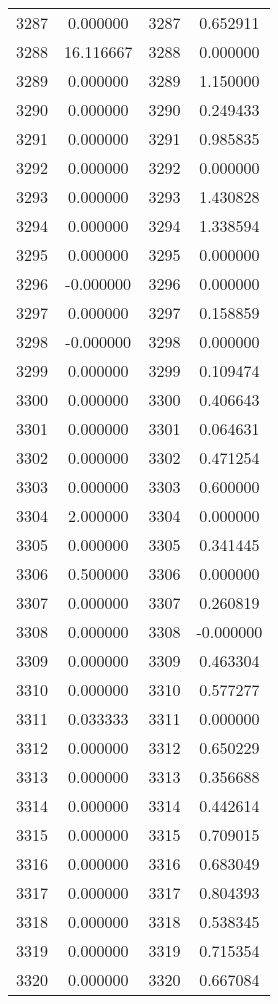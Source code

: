 \documentclass[12pt]{article}
\begin{document}
\begin{longtable}{@{}cccc@{}}
3287 & 0.000000 & 3287 & 0.652911 \\
3288 & 16.116667 & 3288 & 0.000000 \\
3289 & 0.000000 & 3289 & 1.150000 \\
3290 & 0.000000 & 3290 & 0.249433 \\
3291 & 0.000000 & 3291 & 0.985835 \\
3292 & 0.000000 & 3292 & 0.000000 \\
3293 & 0.000000 & 3293 & 1.430828 \\
3294 & 0.000000 & 3294 & 1.338594 \\
3295 & 0.000000 & 3295 & 0.000000 \\
3296 & -0.000000 & 3296 & 0.000000 \\
3297 & 0.000000 & 3297 & 0.158859 \\
3298 & -0.000000 & 3298 & 0.000000 \\
3299 & 0.000000 & 3299 & 0.109474 \\
3300 & 0.000000 & 3300 & 0.406643 \\
3301 & 0.000000 & 3301 & 0.064631 \\
3302 & 0.000000 & 3302 & 0.471254 \\
3303 & 0.000000 & 3303 & 0.600000 \\
3304 & 2.000000 & 3304 & 0.000000 \\
3305 & 0.000000 & 3305 & 0.341445 \\
3306 & 0.500000 & 3306 & 0.000000 \\
3307 & 0.000000 & 3307 & 0.260819 \\
3308 & 0.000000 & 3308 & -0.000000 \\
3309 & 0.000000 & 3309 & 0.463304 \\
3310 & 0.000000 & 3310 & 0.577277 \\
3311 & 0.033333 & 3311 & 0.000000 \\
3312 & 0.000000 & 3312 & 0.650229 \\
3313 & 0.000000 & 3313 & 0.356688 \\
3314 & 0.000000 & 3314 & 0.442614 \\
3315 & 0.000000 & 3315 & 0.709015 \\
3316 & 0.000000 & 3316 & 0.683049 \\
3317 & 0.000000 & 3317 & 0.804393 \\
3318 & 0.000000 & 3318 & 0.538345 \\
3319 & 0.000000 & 3319 & 0.715354 \\
3320 & 0.000000 & 3320 & 0.667084 \\

\end{longtable}
\end{document}
